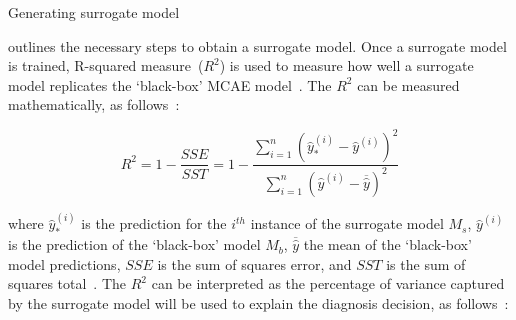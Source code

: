 \begin{algorithm*}[h]
\caption{Generating surrogate model}
\small{
    \DontPrintSemicolon {}%
    \BlankLine%
    \BlankLine%
    }
     \label{algo:surrogate_model_generation}
\end{algorithm*}

\hspace*{3.5mm}  outlines the necessary steps to obtain a surrogate model. Once a surrogate model is trained, R-squared measure~($R^2$) is used to measure how well a surrogate model replicates the `black-box' MCAE model~\cite{molnar2019interpretable}. The $R^2$ can be measured mathematically, as follows~\cite{molnar2019interpretable}: 

\begin{equation}
    R^{2}=1-\frac{SSE}{SST}=1-\frac{\sum_{i=1}^{n}\left(\hat{y}_{*}^{(i)}-\hat{y}^{(i)}\right)^{2}}{\sum_{i=1}^{n}\left(\hat{y}^{(i)}-\overline{\hat{y}}\right)^{2}}
    \label{ew:r_squared}
\end{equation}

\hspace*{3.5mm} where $\hat{y}_{*}^{(i)}$ is the prediction for the $i^{th}$ instance of the surrogate model $M_s$, $\hat{y}^{(i)}$ is the prediction of the `black-box' model $M_b$, $\overline{\hat{y}}$ the mean of the `black-box' model predictions, $SSE$ is the sum of squares error, and $SST$ is the sum of squares total~\cite{molnar2019interpretable}. The $R^2$ can be interpreted as the percentage of variance captured by the surrogate model will be used to explain the diagnosis decision, as follows~\cite{molnar2019interpretable}:

